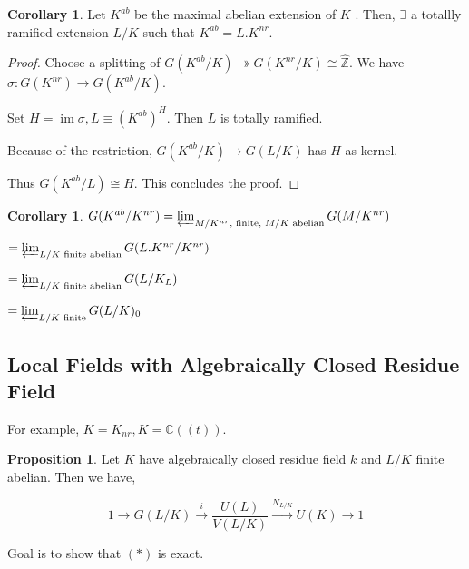 \documentclass{article}
\theoremstyle{definition}
\numberwithin{theorem}{subsection}
\newtheorem{proposition}[theorem]{Proposition}
\newtheorem{corollary}[theorem]{Corollary}
\begin{document}
    \begin{corollary}
        Let \(K^{ab}\) be the maximal abelian extension of \(K\) . Then, \(\exists\) a totallly ramified extension \(L / K\) such that \(K^{ab} = L . K^{nr}\).
    \end{corollary}

    \begin{proof}
        Choose a splitting of \(G(K^{ab} / K) \twoheadrightarrow G(K^{nr} / K) \cong \widehat{\mathbb{Z}}\). We have \(\sigma : G(K^{nr}) \to G(K^{ab} / K)\).
        
        Set \(H = \operatorname{im} \sigma, L \equiv  (K^{ab})^H\). Then \(L\) is totally ramified.
        
        Because of the restriction, \(G(K^{ab} / K) \to G(L / K)\) has \(H\) as kernel.
        
        Thus \(G(K^{ab} / L) \cong H\). This concludes the proof.
    \end{proof}

    \begin{corollary}
        \(G(K^{ab} / K^{nr}) = \varprojlim_{M / K^{nr}, \text{ finite, } M / K \text{ abelian} } G(M / K^{nr})\)
        
        \(=\varprojlim_{L / K \text{ finite abelian} } G(L.K^{nr} / K^{nr})\)

        \(= \varprojlim_{L / K \text{ finite abelian}} G(L / K_L)\) 

        \(= \varprojlim_{L / K \text{ finite}} G(L / K)_0\)
    \end{corollary}

    \subsection*{Local Fields with Algebraically Closed Residue Field}

    For example, \(K = K_{nr}, K = \mathbb{C} ((t))\).

    \begin{proposition}
        
        Let \(K\) have algebraically closed residue field \(k\) and \(L / K\) finite abelian. Then we have,

        \[
            1 \to G(L / K) \xrightarrow{i} \frac{U(L)}{V(L / K)} \xrightarrow{N_{L / K}} U(K) \to 1\tag*{\((\ast)\)}
        \]
    \end{proposition}

    Goal is to show that \((\ast)\) is exact.
\end{document}
